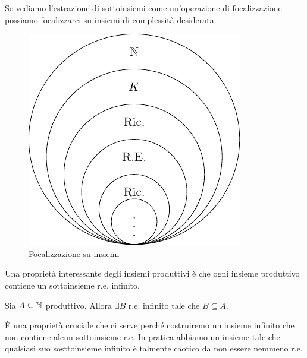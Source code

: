 Se vediamo l'estrazione di sottoinsiemi come un'operazione di focalizzazione possiamo focalizzarci
su insiemi di complessità desiderata 

\begin{figure}[h]
    \centering
    \includegraphics{./img/reducibility/SetsResolution.pdf}
    \caption{Focalizzazione su insiemi}
\end{figure}

Una proprietà interessante degli insiemi produttivi è che ogni insieme produttivo contiene un
sottoinsieme r.e. infinito.

\begin{thm}
    Sia $A \subseteq \mathbb{N}$ produttivo. Allora $\exists B$ r.e. infinito tale che $B \subseteq A$.
\end{thm}

È una proprietà cruciale che ci serve perché costruiremo un insieme infinito che non contiene
alcun sottoinsieme r.e. In pratica abbiamo un insieme tale che qualsiasi suo sosttoinsieme infinito
è talmente caotico da non essere nemmeno r.e.

